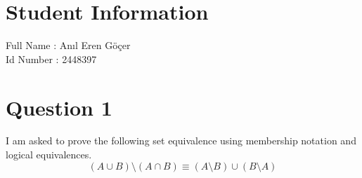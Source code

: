 \documentclass[11pt]{article}
\begin{document}
\section*{Student Information } 
Full Name :  Anıl Eren Göçer \\
Id Number :  2448397 \\

\section*{Question 1}
I am asked to prove the following set equivalence using membership notation and logical equivalences.
\begin{equation*}
    (A \cup B) \setminus (A \cap B) \equiv (A \setminus B) \cup (B \setminus A)
\end{equation*}
\end{document}
